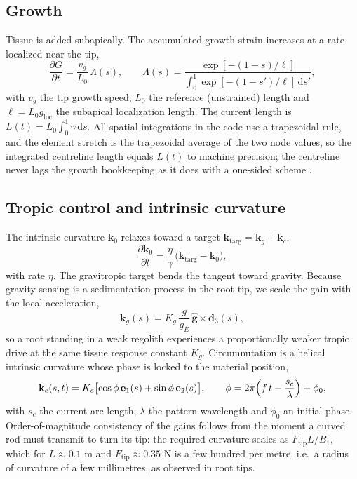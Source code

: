\documentclass[preprint,12pt]{elsarticle}
\begin{document}
\subsection{Growth}
\label{sec:growth}

Tissue is added subapically. The accumulated growth strain increases at a
rate localized near the tip,
\begin{equation}
  \frac{\partial G}{\partial t} = \frac{v_g}{L_0}\,\Lambda(s),
  \qquad
  \Lambda(s)=\frac{\exp[-(1-s)/\ell]}{\int_0^1 \exp[-(1-s')/\ell]\,\mathrm{d}s'},
  \label{eq:growth}
\end{equation}
with $v_g$ the tip growth speed, $L_0$ the reference (unstrained) length and
$\ell=L_0 g_{\mathrm{loc}}$ the subapical localization length. The current
length is $L(t)=L_0\int_0^1\gamma\,\mathrm{d}s$. All spatial integrations in
the code use a trapezoidal rule, and the element stretch is the trapezoidal
average of the two node values, so the integrated centreline length equals
$L(t)$ to machine precision; the centreline never lags the growth bookkeeping
as it does with a one-sided scheme \cite{moulton2013}.

\subsection{Tropic control and intrinsic curvature}
\label{sec:tropic}

The intrinsic curvature $\mathbf k_0$ relaxes toward a target
$\mathbf k_{\mathrm{targ}}=\mathbf k_g+\mathbf k_c$,
\begin{equation}
  \frac{\partial \mathbf k_0}{\partial t}
  = \frac{\eta}{\gamma}\,\bigl(\mathbf k_{\mathrm{targ}}-\mathbf k_0\bigr),
  \label{eq:relax}
\end{equation}
with rate $\eta$. The gravitropic target bends the tangent toward gravity.
Because gravity sensing is a sedimentation process in the root tip, we scale
the gain with the local acceleration,
\begin{equation}
  \mathbf k_g(s) = K_g\,\frac{g}{g_E}\,\hat{\mathbf g}\times\mathbf d_3(s),
  \label{eq:grav}
\end{equation}
so a root standing in a weak regolith experiences a proportionally weaker
tropic drive at the same tissue response constant $K_g$. Circumnutation is a
helical intrinsic curvature whose phase is locked to the material position,
\begin{equation}
  \mathbf k_c(s,t) = K_c\bigl[\cos\phi\,\mathbf e_1(s) + \sin\phi\,\mathbf e_2(s)\bigr],
  \qquad
  \phi = 2\pi\Bigl(f\,t-\frac{s_c}{\lambda}\Bigr)+\phi_0,
  \label{eq:circ}
\end{equation}
with $s_c$ the current arc length, $\lambda$ the pattern wavelength and
$\phi_0$ an initial phase. Order-of-magnitude consistency of the gains
follows from the moment a curved rod must transmit to turn its tip: the
required curvature scales as $F_{\mathrm{tip}}L/B_1$, which for $L\approx
0.1$ m and $F_{\mathrm{tip}}\approx 0.35$ N is a few hundred per metre,
i.e.\ a radius of curvature of a few millimetres, as observed in root tips.
\end{document}
